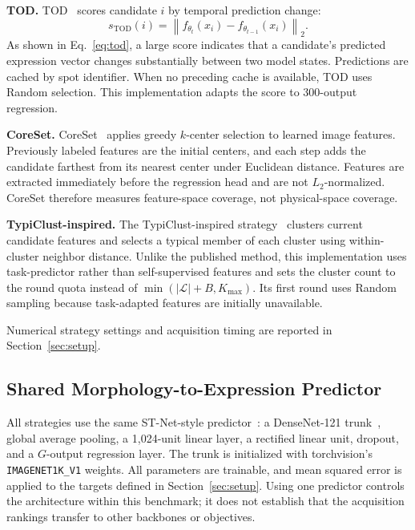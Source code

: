 \documentclass[]{spie}
\begin{document}
\noindent\textbf{TOD.}
TOD~\cite{huang2021semi} scores candidate $i$ by temporal prediction change:
\begin{equation}
s_{\mathrm{TOD}}(i)=\left\|f_{\theta_t}(x_i)-f_{\theta_{t-1}}(x_i)\right\|_2.
\label{eq:tod}
\end{equation}
As shown in Eq.~\ref{eq:tod}, a large score indicates that a candidate's predicted expression vector changes substantially between two model states. Predictions are cached by spot identifier. When no preceding cache is available, TOD uses Random selection. This implementation adapts the score to 300-output regression.

\noindent\textbf{CoreSet.}
CoreSet~\cite{sener2018active} applies greedy $k$-center selection to learned image features. Previously labeled features are the initial centers, and each step adds the candidate farthest from its nearest center under Euclidean distance. Features are extracted immediately before the regression head and are not $L_2$-normalized. CoreSet therefore measures feature-space coverage, not physical-space coverage.

\noindent\textbf{TypiClust-inspired.}
The TypiClust-inspired strategy~\cite{hacohen2022active} clusters current candidate features and selects a typical member of each cluster using within-cluster neighbor distance. Unlike the published method, this implementation uses task-predictor rather than self-supervised features and sets the cluster count to the round quota instead of $\min(|\mathcal{L}|+B,K_{\max})$. Its first round uses Random sampling because task-adapted features are initially unavailable.

Numerical strategy settings and acquisition timing are reported in Section~\ref{sec:setup}.

\subsection{Shared Morphology-to-Expression Predictor}
\label{sec:predictor}

All strategies use the same ST-Net-style predictor~\cite{he2020integrating}: a DenseNet-121 trunk~\cite{huang2017densely}, global average pooling, a 1,024-unit linear layer, a rectified linear unit, dropout, and a $G$-output regression layer. The trunk is initialized with torchvision's \texttt{IMAGENET1K\_}\allowbreak\texttt{V1} weights. All parameters are trainable, and mean squared error is applied to the targets defined in Section~\ref{sec:setup}. Using one predictor controls the architecture within this benchmark; it does not establish that the acquisition rankings transfer to other backbones or objectives.
\end{document}
